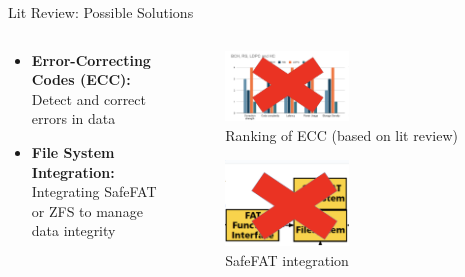 \begin{frame}{Lit Review: Possible Solutions}
    \begin{columns}
        \begin{column}{0.5\textwidth}
            \begin{itemize}
                \item \textbf{Error-Correcting Codes (ECC):} Detect and correct errors in data
                \item \textbf{File System Integration:} Integrating SafeFAT or ZFS to manage data integrity
           \end{itemize}
        \end{column}
        \begin{column}{0.5\textwidth}
            \begin{figure}
                \centering
                \includegraphics[height=0.4\textheight,width=0.5\textwidth,keepaspectratio]{images/ecc_x.png}
                \caption{Ranking of ECC (based on lit review)}
            \end{figure}
            \begin{figure}
                \centering
                \includegraphics[height=0.4\textheight,width=0.5\textwidth,keepaspectratio]{images/safefat_x.png}
                \caption{SafeFAT integration}
            \end{figure}
        \end{column}
    \end{columns}  
\end{frame}

